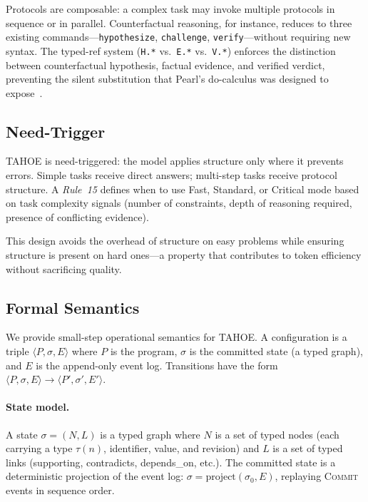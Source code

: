 \documentclass[11pt,a4paper]{article}
\begin{document}
Protocols are composable: a complex task may invoke multiple protocols in sequence or in parallel.
Counterfactual reasoning, for instance, reduces to three existing commands---\texttt{hypothesize}, \texttt{challenge}, \texttt{verify}---without requiring new syntax.
The typed-ref system (\texttt{H.*} vs.\ \texttt{E.*} vs.\ \texttt{V.*}) enforces the distinction between counterfactual hypothesis, factual evidence, and verified verdict, preventing the silent substitution that Pearl's do-calculus was designed to expose~\cite{pearl2009causality}.

\subsection{Need-Trigger}
\label{subsec:need-trigger}

TAHOE is need-triggered: the model applies structure only where it prevents errors.
Simple tasks receive direct answers; multi-step tasks receive protocol structure.
A \emph{Rule~15} defines when to use Fast, Standard, or Critical mode based on task complexity signals (number of constraints, depth of reasoning required, presence of conflicting evidence).

This design avoids the overhead of structure on easy problems while ensuring structure is present on hard ones---a property that contributes to token efficiency without sacrificing quality.

\subsection{Formal Semantics}
\label{subsec:formal}

We provide small-step operational semantics for TAHOE.
A configuration is a triple $\langle P, \sigma, E \rangle$ where $P$ is the program, $\sigma$ is the committed state (a typed graph), and $E$ is the append-only event log.
Transitions have the form $\langle P, \sigma, E \rangle \to \langle P', \sigma', E' \rangle$.

\paragraph{State model.}
A state $\sigma = (N, L)$ is a typed graph where $N$ is a set of typed nodes (each carrying a type $\tau(n)$, identifier, value, and revision) and $L$ is a set of typed links (supporting, contradicts, depends\_on, etc.).
The committed state is a deterministic projection of the event log: $\sigma = \text{project}(\sigma_0, E)$, replaying \textsc{Commit} events in sequence order.
\end{document}
